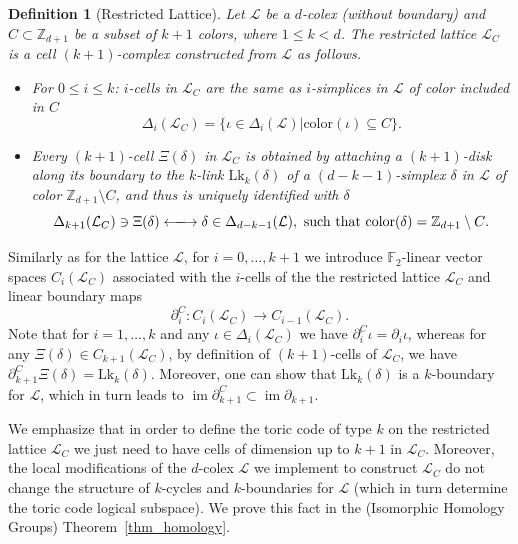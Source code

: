 \documentclass[onecolumn,letterpaper,11pt,accepted=2022-12-19]{quantumarticle}
\newcommand{\face}[2]{{\Delta_{#1}(#2)}}
\newcommand{\link}[2]{{\mathrm{Lk}_{#1}(#2)}}
\DeclareMathOperator{\im}{im}
\newcommand{\col}[1]{{\mathrm{color}(#1)}}
\newtheorem{definition}{Definition}
\theoremstyle{definition}
\theoremstyle{lemma}
\theoremstyle{theorem}
\theoremstyle{corollary}
\begin{document}
{\begin{definition}[Restricted Lattice]
Let $\mathcal{L}$ be a $d$-colex (without boundary) and $C \subset \mathbb{Z}_{d+1}$ be a subset of $k+1$ colors, where $1\leq k< d$.
The restricted lattice $\mathcal{L}_C$ is a cell $(k+1)$-complex constructed from $\mathcal{L}$ as follows.
\begin{itemize}
\item For $0\leq i \leq k$: $i$-cells in $\mathcal{L}_C$ are the same as $i$-simplices in $\mathcal{L}$ of color included in $C$
\begin{equation}
\face i {\mathcal{L}_C} = \{ \iota\in\face i {\mathcal{L}} | \col\iota \subseteq C\}.
\end{equation}
\item Every $(k+1)$-cell $\Xi(\delta)$ in $\mathcal{L}_C$ is obtained by attaching a $(k+1)$-disk along its boundary to the $k$-link $\link k \delta$ of a $(d-k-1)$-simplex $\delta$ in $\mathcal{L}$ of color $\mathbb{Z}_{d+1}\setminus C$, and thus is uniquely identified with $\delta$
\begin{equation}
\label{eq_new_cells}
\face {k+1}{\mathcal{L}_C} \ni \Xi(\delta) \xlongleftrightarrow{} 
\delta\in\face {d-k-1}{\mathcal{L}},\textrm{ such that } \col{\delta} = {\mathbb{Z}_{d+1}\setminus C}.
\end{equation}
\end{itemize}
\end{definition}

Similarly as for the lattice $\mathcal{L}$, for $i=0,\ldots,k+1$ we introduce $\mathbb{F}_2$-linear vector spaces $C_i(\mathcal{L}_C)$ associated with the $i$-cells of the the restricted lattice $\mathcal{L}_C$ and linear boundary maps
\begin{equation}
\partial_i^C: C_i(\mathcal{L}_C)\rightarrow C_{i-1}(\mathcal{L}_C).
\end{equation}
Note that for $i=1,\ldots, k$ and any $\iota\in\face i {\mathcal{L}_C}$ we have $\partial_i^C \iota = \partial_i \iota$, whereas for any $\Xi(\delta)\in C_{k+1}(\mathcal{L}_C)$, by definition of $(k+1)$-cells of $\mathcal{L}_C$, we have $\partial_{k+1}^C\Xi(\delta)= \link k \delta$.
Moreover, one can show that $\link k \delta$ is a $k$-boundary for $\mathcal{L}$, which in turn leads to $\im\partial_{k+1}^C\subset \im \partial_{k+1}$.


We emphasize that in order to define the toric code of type $k$ on the restricted lattice $\mathcal{L}_C$ we just need to have cells of dimension up to $k+1$ in $\mathcal{L}_C$.
Moreover, the local modifications of the $d$-colex $\mathcal{L}$ we implement to construct $\mathcal{L}_C$ do not change the structure of $k$-cycles and $k$-boundaries for $\mathcal{L}$ (which in turn determine the toric code logical subspace).
We prove this fact in the (Isomorphic Homology Groups) Theorem~\ref{thm_homology}.


}
\end{document}
